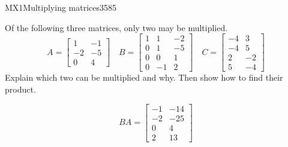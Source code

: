 \begin{exercise}{MX1}{Multiplying matrices}{3585} 
\begin{exerciseStatement} 

Of the following three matrices, only two may be multiplied. \[
          A=\left[\begin{array}{cc}
1 & -1 \\
-2 & -5 \\
0 & 4
\end{array}\right] \hspace{1em} B=\left[\begin{array}{ccc}
1 & 1 & -2 \\
0 & 1 & -5 \\
0 & 0 & 1 \\
0 & -1 & 2
\end{array}\right] \hspace{1em} C=\left[\begin{array}{cc}
-4 & 3 \\
-4 & 5 \\
2 & -2 \\
5 & -4
\end{array}\right]
      \] Explain which two can be multiplied and why. Then show how to find their product.

 \end{exerciseStatement}
 \begin{exerciseAnswer} \[BA=\left[\begin{array}{cc}
-1 & -14 \\
-2 & -25 \\
0 & 4 \\
2 & 13
\end{array}\right]\] \end{exerciseAnswer}
 \end{exercise}


